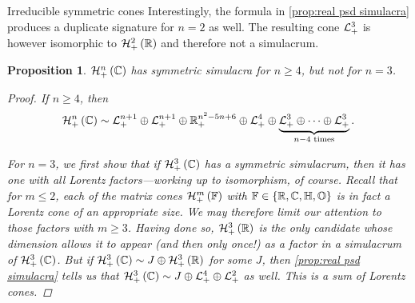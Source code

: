 \documentclass{interact}
\theoremstyle{plain}
\newtheorem{proposition}[theorem]{Proposition}
\theoremstyle{definition}
\theoremstyle{remark}
\begin{document}
\begin{section}{Irreducible symmetric cones}
    Interestingly, the formula in \cref{prop:real psd simulacra}
    produces a duplicate signature for $n=2$ as well. The resulting
    cone $\Lnplus[3]$ is however isomorphic to $\Hnplus[2]\of{\Rn[1]}$
    and therefore not a simulacrum.

    \begin{proposition}\label{prop:complex psd simulacra}
      $\Hnplus[n]\of{\Cn[1]}$ has symmetric simulacra for $n \ge 4$,
      but not for $n = 3$.

      \begin{proof}
        If $n \ge 4$, then
        \begin{equation*}
          \Hnplus\of{\Cn[1]}
          \sim \Lnplus[n+1]
               \oplus \Lnplus[n+1]
               \oplus \Rnplus[n^{2} - 5n + 6]
               \oplus \Lnplus[4]
               \oplus \underbrace{\Lnplus[3] \oplus \cdots \oplus \Lnplus[3]}_{n-4 \text{ times}}.
        \end{equation*}

        For $n = 3$, we first show that if $\Hnplus[3]\of{\Cn[1]}$ has
        a symmetric simulacrum, then it has one with all Lorentz
        factors---working up to isomorphism, of course. Recall that
        for $m \le 2$, each of the matrix cones
        $\Hnplus[m]\of{\Fn[1]}$ with $\Fn[1] \in \set{\Rn[1], \Cn[1],
          \quaternions, \octonions}$ is in fact a Lorentz cone of an
        appropriate size. We may therefore limit our attention to
        those factors with $m \ge 3$. Having done so,
        $\Hnplus[3]\of{\Rn[1]}$ is the only candidate whose dimension
        allows it to appear (and then only once!) as a factor in a
        simulacrum of $\Hnplus[3]\of{\Cn[1]}$. But if
        $\Hnplus[3]\of{\Cn[1]} \sim
        \directsum{J}{\Hnplus[3]\of{\Rn[1]}}$ for some $J$, then
        \cref{prop:real psd simulacra} tells us that
        $\Hnplus[3]\of{\Cn[1]} \sim J \oplus \Lnplus[4] \oplus
        \Lnplus[2]$ as well. This is a sum of Lorentz cones.


\end{proof}
\end{proposition}
\end{section}
\end{document}
